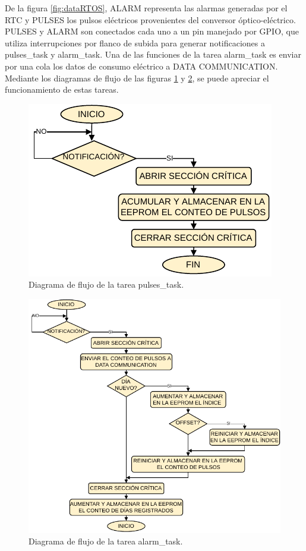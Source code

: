 De la figura \ref{fig:dataRTOS}, ALARM representa las alarmas generadas por el RTC y PULSES los pulsos eléctricos provenientes del conversor óptico-eléctrico. PULSES y ALARM son conectados cada uno a un pin manejado por GPIO, que utiliza interrupciones por flanco de subida para generar notificaciones a pulses\_task y alarm\_task. Una de las funciones de la tarea alarm\_task es enviar por una cola los datos de consumo eléctrico a DATA COMMUNICATION.  Mediante los diagramas de flujo de las figuras \ref{fig:flowDataPulses} y \ref{fig:flowDataAlarm}, se puede apreciar el funcionamiento de estas tareas.

\begin{figure}[h]
	\centering
	\includegraphics[scale=1]{./Figures/data_logger_pulses.pdf}
	\caption{Diagrama de flujo de la tarea pulses\_task.}
		\label{fig:flowDataPulses}
\end{figure}

\begin{figure}[h]
	\centering
	\includegraphics[scale=1]{./Figures/data_logger_alarm.pdf}
	\caption{Diagrama de flujo de la tarea alarm\_task.}
		\label{fig:flowDataAlarm}
\end{figure}

